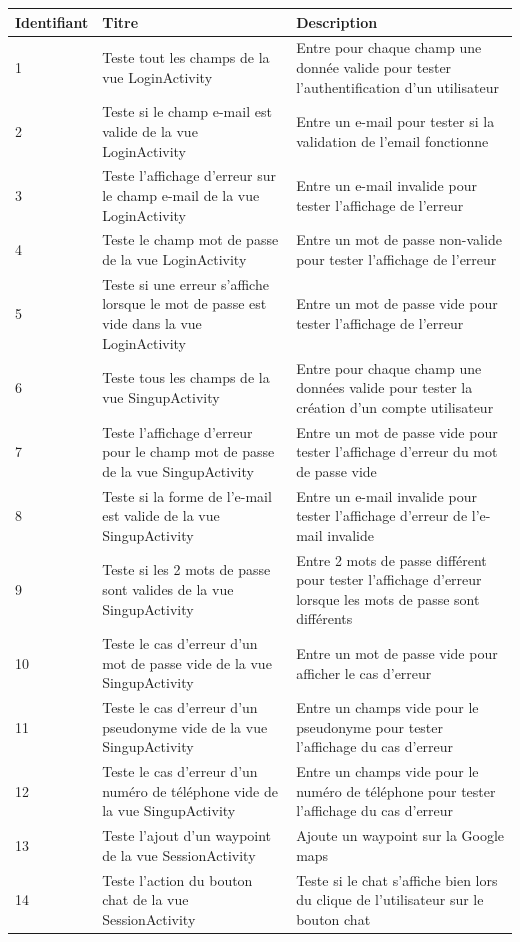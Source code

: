 \documentclass[titlepage, 12pt]{report}
\begin{document}
\begin{table}[ht]
\begin{tabularx}{\textwidth}{|X|X|X|}
\hline
Identifiant & Titre & Description \\
\hline
1 & Teste tout les champs de la vue LoginActivity & Entre pour chaque champ une donnée valide pour tester l'authentification d'un utilisateur \\
\hline
2 & Teste si le champ e-mail est valide de la vue LoginActivity & Entre un e-mail pour tester si la validation de l'email fonctionne \\ 
\hline
3 & Teste l'affichage d'erreur sur le champ e-mail de la vue LoginActivity & Entre un e-mail invalide pour tester l'affichage de l'erreur \\
\hline
4 & Teste le champ mot de passe de la vue LoginActivity & Entre un mot de passe non-valide pour tester l'affichage de l'erreur \\
\hline
5 & Teste si une erreur s'affiche lorsque le mot de passe est vide dans la vue LoginActivity & Entre un mot de passe vide pour tester l'affichage de l'erreur \\
\hline
6 & Teste tous les champs de la vue SingupActivity & Entre pour chaque champ une données valide pour tester la création d'un compte utilisateur \\
\hline
7 & Teste l'affichage d'erreur pour le champ mot de passe de la vue SingupActivity & Entre un mot de passe vide pour tester l'affichage d'erreur du mot de passe vide \\
\hline
8 & Teste si la forme de l'e-mail est valide de la vue SingupActivity & Entre un e-mail invalide pour tester l'affichage d'erreur de l'e-mail invalide \\
\hline
9 & Teste si les 2 mots de passe sont valides de la vue SingupActivity & Entre 2 mots de passe différent pour tester l'affichage d'erreur lorsque les mots de passe sont différents \\
\hline
10 & Teste le cas d'erreur d'un mot de passe vide de la vue SingupActivity & Entre un mot de passe vide pour afficher le cas d'erreur \\
\hline
11 & Teste le cas d'erreur d'un pseudonyme vide de la vue SingupActivity & Entre un champs vide pour le pseudonyme pour tester l'affichage du cas d'erreur \\
\hline
12 & Teste le cas d'erreur d'un numéro de téléphone vide de la vue SingupActivity & Entre un champs vide pour le numéro de téléphone pour tester l'affichage du cas d'erreur \\
\hline
13 & Teste l'ajout d'un waypoint de la vue SessionActivity & Ajoute un waypoint sur la Google maps \\
\hline
14 & Teste l'action du bouton chat de la vue SessionActivity & Teste si le chat s'affiche bien lors du clique de l'utilisateur sur le bouton chat \\
\hline \hline
\end{tabularx}
\end{table}
\end{document}
